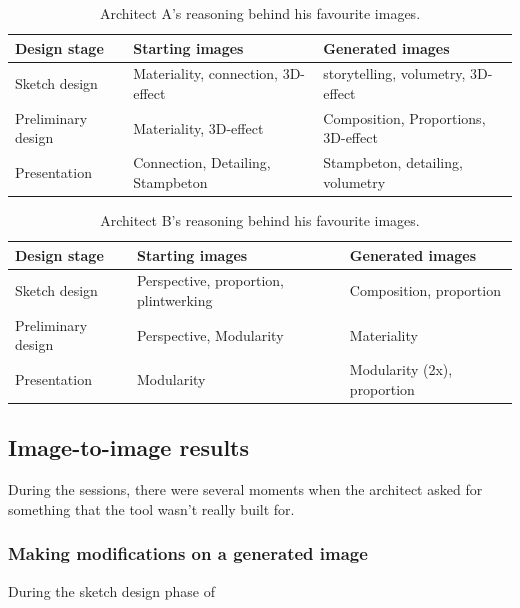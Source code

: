\begin{table}[H]
    \centering
    \begin{tabular}{l||l|l}
        \textbf{Design stage} & \textbf{Starting images} & \textbf{Generated images}\\
        \hline
        Sketch design & Materiality, connection, 3D-effect & storytelling, volumetry, 3D-effect\\
        Preliminary design & Materiality, 3D-effect & Composition, Proportions, 3D-effect\\
        Presentation & Connection, Detailing, Stampbeton & Stampbeton, detailing, volumetry\\
    \end{tabular}
    \caption{Architect A's reasoning behind his favourite images.}
    \label{tab:8-1}
\end{table}

\begin{table}[H]
    \centering
    \begin{tabular}{l||l|l}
        \textbf{Design stage} & \textbf{Starting images} & \textbf{Generated images}\\
        \hline
        Sketch design & Perspective, proportion, plintwerking & Composition, proportion\\
        Preliminary design & Perspective, Modularity & Materiality\\
        Presentation & Modularity & Modularity (2x), proportion\\
    \end{tabular}
    \caption{Architect B's reasoning behind his favourite images.}
    \label{tab:8-2}
\end{table}
\subsection{Image-to-image results}
During the sessions, there were several moments when the architect asked for something that the tool wasn't really built for.
\subsubsection{Making modifications on a generated image}
During the sketch design phase of 
